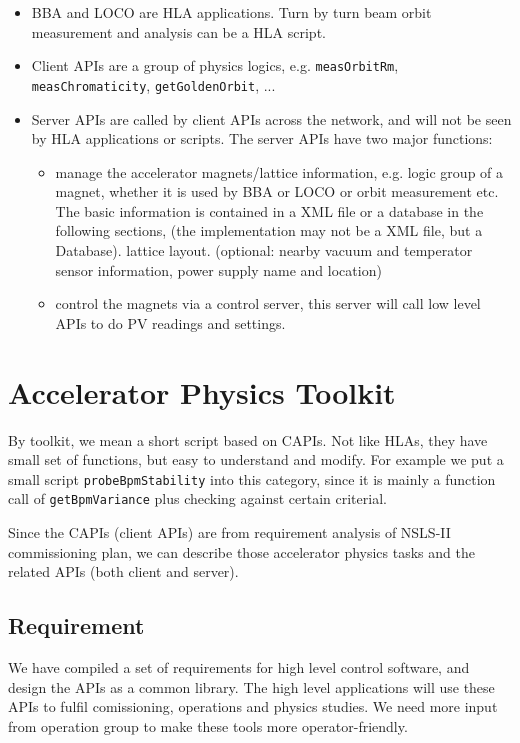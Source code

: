 \documentclass[letterpaper,showtrims]{memoir}
\newcommand{\code}[1]{\texttt{#1}}
\begin{document}
\begin{itemize}
\item BBA and LOCO are HLA applications. Turn by turn beam orbit
  measurement and analysis can be a HLA script.
\item Client APIs are a group of physics logics, e.g. \code{measOrbitRm},
  \code{measChromaticity}, \code{getGoldenOrbit}, ...
\item Server APIs are called by client APIs across the network, and will
  not be seen by HLA applications or scripts. The server APIs have two
  major functions:
  \begin{itemize}%
  \item manage the accelerator magnets/lattice information, e.g. logic
    group of a magnet, whether it is used by BBA or LOCO or orbit
    measurement etc. The basic information is contained in a XML file or a
    database in the following sections, (the implementation may not be a
    XML file, but a Database). lattice layout. (optional: nearby vacuum
    and temperator sensor information, power supply name and location)
  \item control the magnets via a control server, this server will call
    low level APIs to do PV readings and settings.
  \end{itemize}
\end{itemize}


\chapter{Accelerator Physics Toolkit}

By toolkit, we mean a short script based on CAPIs. Not like HLAs, they
have small set of functions, but easy to understand and modify. For
example we put a small script \code{probeBpmStability} into this category,
since it is mainly a function call of \code{getBpmVariance} plus checking
against certain criterial.

Since the CAPIs (client APIs) are from requirement analysis of NSLS-II
commissioning plan, we can describe those accelerator physics tasks and
the related APIs (both client and server).

\section{Requirement}

We have compiled a set of requirements for high level control software,
and design the APIs as a common library. The high level applications will
use these APIs to fulfil comissioning, operations and physics studies. We
need more input from operation group to make these tools more
operator-friendly.
\end{document}
